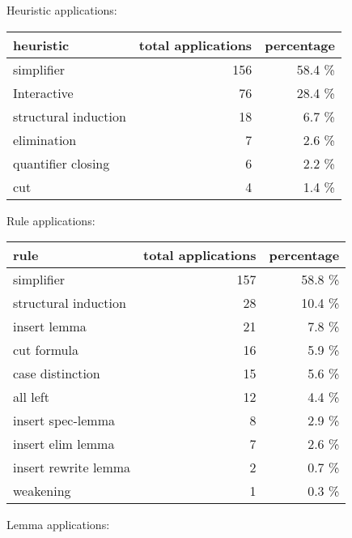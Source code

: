 \documentclass[a4paper]{article}
\begin{document}
Heuristic applications:

\begin{supertabular}{l|r|r}
heuristic	& total applications & percentage \\ \hline
simplifier & 156 & 58.4 \% \\
Interactive & 76 & 28.4 \% \\
structural induction & 18 & 6.7 \% \\
elimination & 7 & 2.6 \% \\
quantifier closing & 6 & 2.2 \% \\
cut & 4 & 1.4 \% \\

\end{supertabular}

Rule applications:

\begin{supertabular}{l|r|r}
rule	        & total applications & percentage \\ \hline
simplifier & 157 & 58.8 \% \\
structural induction & 28 & 10.4 \% \\
insert lemma & 21 & 7.8 \% \\
cut formula & 16 & 5.9 \% \\
case distinction & 15 & 5.6 \% \\
all left & 12 & 4.4 \% \\
insert spec-lemma & 8 & 2.9 \% \\
insert elim lemma & 7 & 2.6 \% \\
insert rewrite lemma & 2 & 0.7 \% \\
weakening & 1 & 0.3 \% \\

\end{supertabular}

Lemma applications:
\end{document}
